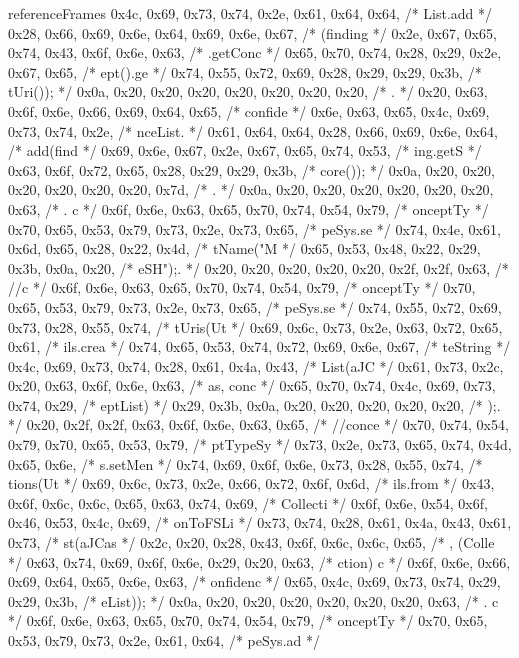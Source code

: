 \begin{chunk}{referenceFrames}
{{{{{{0x4c, 0x69, 0x73, 0x74, 0x2e, 0x61, 0x64, 0x64, /* List.add */
0x28, 0x66, 0x69, 0x6e, 0x64, 0x69, 0x6e, 0x67, /* (finding */
0x2e, 0x67, 0x65, 0x74, 0x43, 0x6f, 0x6e, 0x63, /* .getConc */
0x65, 0x70, 0x74, 0x28, 0x29, 0x2e, 0x67, 0x65, /* ept().ge */
0x74, 0x55, 0x72, 0x69, 0x28, 0x29, 0x29, 0x3b, /* tUri()); */
0x0a, 0x20, 0x20, 0x20, 0x20, 0x20, 0x20, 0x20, /* .        */
0x20, 0x63, 0x6f, 0x6e, 0x66, 0x69, 0x64, 0x65, /*  confide */
0x6e, 0x63, 0x65, 0x4c, 0x69, 0x73, 0x74, 0x2e, /* nceList. */
0x61, 0x64, 0x64, 0x28, 0x66, 0x69, 0x6e, 0x64, /* add(find */
0x69, 0x6e, 0x67, 0x2e, 0x67, 0x65, 0x74, 0x53, /* ing.getS */
0x63, 0x6f, 0x72, 0x65, 0x28, 0x29, 0x29, 0x3b, /* core()); */
0x0a, 0x20, 0x20, 0x20, 0x20, 0x20, 0x20, 0x7d, /* .      } */
0x0a, 0x20, 0x20, 0x20, 0x20, 0x20, 0x20, 0x63, /* .      c */
0x6f, 0x6e, 0x63, 0x65, 0x70, 0x74, 0x54, 0x79, /* onceptTy */
0x70, 0x65, 0x53, 0x79, 0x73, 0x2e, 0x73, 0x65, /* peSys.se */
0x74, 0x4e, 0x61, 0x6d, 0x65, 0x28, 0x22, 0x4d, /* tName("M */
0x65, 0x53, 0x48, 0x22, 0x29, 0x3b, 0x0a, 0x20, /* eSH");.  */
0x20, 0x20, 0x20, 0x20, 0x20, 0x2f, 0x2f, 0x63, /*      //c */
0x6f, 0x6e, 0x63, 0x65, 0x70, 0x74, 0x54, 0x79, /* onceptTy */
0x70, 0x65, 0x53, 0x79, 0x73, 0x2e, 0x73, 0x65, /* peSys.se */
0x74, 0x55, 0x72, 0x69, 0x73, 0x28, 0x55, 0x74, /* tUris(Ut */
0x69, 0x6c, 0x73, 0x2e, 0x63, 0x72, 0x65, 0x61, /* ils.crea */
0x74, 0x65, 0x53, 0x74, 0x72, 0x69, 0x6e, 0x67, /* teString */
0x4c, 0x69, 0x73, 0x74, 0x28, 0x61, 0x4a, 0x43, /* List(aJC */
0x61, 0x73, 0x2c, 0x20, 0x63, 0x6f, 0x6e, 0x63, /* as, conc */
0x65, 0x70, 0x74, 0x4c, 0x69, 0x73, 0x74, 0x29, /* eptList) */
0x29, 0x3b, 0x0a, 0x20, 0x20, 0x20, 0x20, 0x20, /* );.      */
0x20, 0x2f, 0x2f, 0x63, 0x6f, 0x6e, 0x63, 0x65, /*  //conce */
0x70, 0x74, 0x54, 0x79, 0x70, 0x65, 0x53, 0x79, /* ptTypeSy */
0x73, 0x2e, 0x73, 0x65, 0x74, 0x4d, 0x65, 0x6e, /* s.setMen */
0x74, 0x69, 0x6f, 0x6e, 0x73, 0x28, 0x55, 0x74, /* tions(Ut */
0x69, 0x6c, 0x73, 0x2e, 0x66, 0x72, 0x6f, 0x6d, /* ils.from */
0x43, 0x6f, 0x6c, 0x6c, 0x65, 0x63, 0x74, 0x69, /* Collecti */
0x6f, 0x6e, 0x54, 0x6f, 0x46, 0x53, 0x4c, 0x69, /* onToFSLi */
0x73, 0x74, 0x28, 0x61, 0x4a, 0x43, 0x61, 0x73, /* st(aJCas */
0x2c, 0x20, 0x28, 0x43, 0x6f, 0x6c, 0x6c, 0x65, /* , (Colle */
0x63, 0x74, 0x69, 0x6f, 0x6e, 0x29, 0x20, 0x63, /* ction) c */
0x6f, 0x6e, 0x66, 0x69, 0x64, 0x65, 0x6e, 0x63, /* onfidenc */
0x65, 0x4c, 0x69, 0x73, 0x74, 0x29, 0x29, 0x3b, /* eList)); */
0x0a, 0x20, 0x20, 0x20, 0x20, 0x20, 0x20, 0x63, /* .      c */
0x6f, 0x6e, 0x63, 0x65, 0x70, 0x74, 0x54, 0x79, /* onceptTy */
0x70, 0x65, 0x53, 0x79, 0x73, 0x2e, 0x61, 0x64, /* peSys.ad */
}}}}}
\end{chunk}
